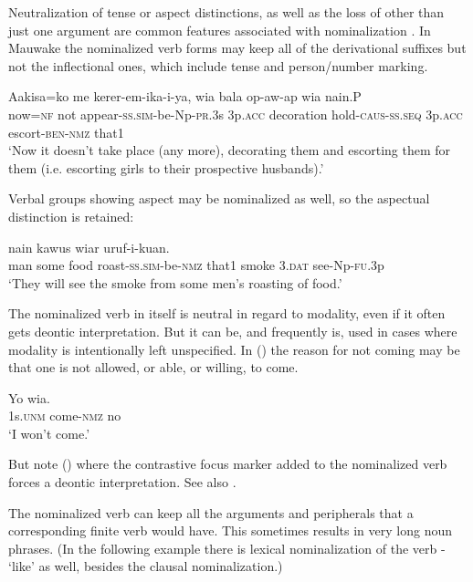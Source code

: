 Neutralization of tense or aspect distinctions, as well as the loss of other than just one argument are common features associated with nominalization \citep[737--738]{HopperEtAl1984}. In Mauwake the nominalized verb forms may keep all of the derivational suffixes but not the inflectional ones, which include tense and person/number marking.

\ea%
\label{ex:x1226}
\gll Aakisa=ko  me  kerer-em-ika-i-ya,  wia  bala op-aw-ap  wia    nain.P{\footnotemark} \\
     now=\textsc{nf}  not  appear-\textsc{ss}.\textsc{sim}-be-Np-\textsc{pr}.3s  3p.\textsc{acc}  decoration hold-\textsc{caus}-\textsc{ss}.\textsc{seq}  3p.\textsc{acc}  escort-\textsc{ben}-\textsc{nmz}  that1 \\
\glt `Now it doesn't take place (any more), decorating them and escorting them for them (i.e. escorting girls to their prospective husbands).'
\z
{}

Verbal groups showing aspect may be nominalized as well, so the aspectual distinction is retained: 

\ea%
\label{ex:x1841}
  nain  kawus  wiar uruf-i-kuan. \\
     man  some  food  roast-\textsc{ss}.\textsc{sim}-be-\textsc{nmz}  that1  smoke  3.\textsc{dat} see-Np-\textsc{fu}.3p \\
\glt `They will see the smoke from some men's roasting of food.'
\z

The nominalized verb in itself is neutral in regard to modality, even if it often gets deontic interpretation. But it can be, and frequently is, used in cases where modality is intentionally left unspecified. In () the reason for not coming may be that one is not allowed, or able, or willing, to come. 

\ea%
\label{ex:x1257}
\gll Yo    wia. \\
     1s.\textsc{unm}  come-\textsc{nmz}  no \\
\glt `I won't come.'
\z

But note () where the contrastive focus marker added to the nominalized verb forces a deontic interpretation. See also . 

The nominalized verb can keep all the arguments and peripherals that a corresponding finite verb would have. This sometimes results in very long noun phrases. (In the following example there is lexical nominalization of the verb - `like' as well, besides the clausal nominalization.)


